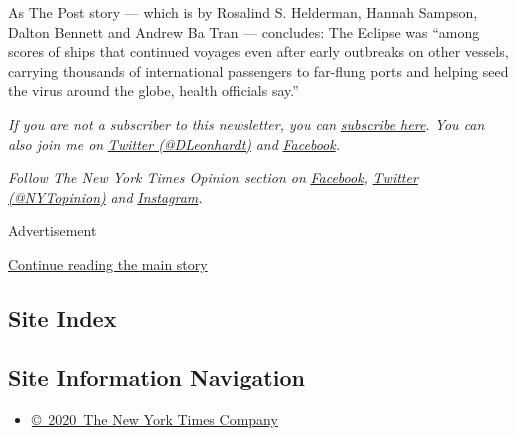 As The Post story --- which is by Rosalind S. Helderman, Hannah Sampson,
Dalton Bennett and Andrew Ba Tran --- concludes: The Eclipse was ``among
scores of ships that continued voyages even after early outbreaks on
other vessels, carrying thousands of international passengers to
far-flung ports and helping seed the virus around the globe, health
officials say.''

\emph{If you are not a subscriber to this newsletter, you can}
\href{https://www.nytimes.com/newsletters/david-leonhardt}{\emph{subscribe
here}}\emph{. You can also join me on}
\href{https://twitter.com/DLeonhardt}{\emph{Twitter (@DLeonhardt)}}
\emph{and}
\href{https://www.facebook.com/DavidRLeonhardt/}{\emph{Facebook}}\emph{.}

\emph{Follow The New York Times Opinion section on}
\href{https://www.facebook.com/nytopinion}{\emph{Facebook}}\emph{,}
\href{http://twitter.com/NYTOpinion}{\emph{Twitter (@NYTopinion)}}
\emph{and}
\href{https://www.instagram.com/nytopinion/}{\emph{Instagram}}\emph{.}

Advertisement

\protect\hyperlink{after-bottom}{Continue reading the main story}

\hypertarget{site-index}{%
\subsection{Site Index}\label{site-index}}

\hypertarget{site-information-navigation}{%
\subsection{Site Information
Navigation}\label{site-information-navigation}}

\begin{itemize}
\tightlist
\item
  \href{https://help.nytimes.com/hc/en-us/articles/115014792127-Copyright-notice}{©~2020~The
  New York Times Company}
\end{itemize}

